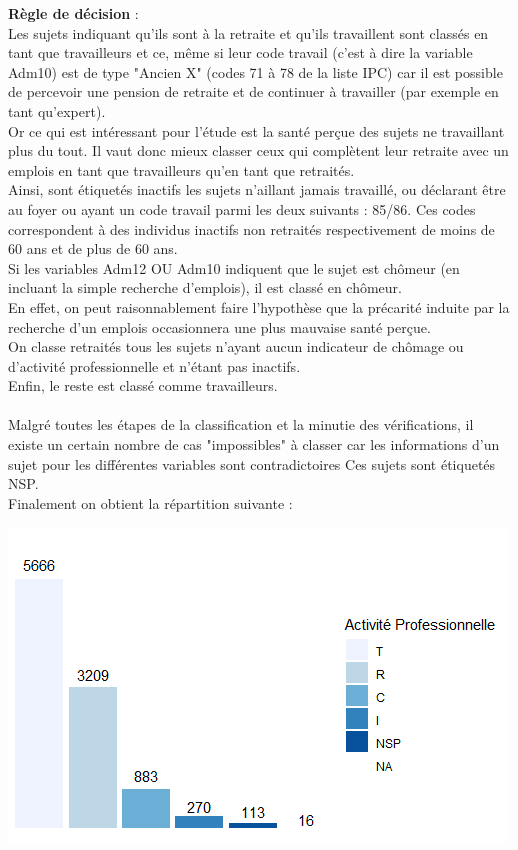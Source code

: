 \documentclass{book}
\begin{document}
\noindent
\textbf{Règle de décision} : \\

\noindent
Les sujets indiquant qu'ils sont à la retraite et qu'ils travaillent sont classés en tant que travailleurs et ce, même si leur code travail (c'est à dire la variable Adm10) est de type "Ancien X" (codes 71 à 78 de la liste IPC) car il est possible de percevoir une pension de retraite et de continuer à travailler (par exemple en tant qu'expert). \\
Or ce qui est intéressant pour l'étude est la santé perçue des sujets ne travaillant plus du tout. Il vaut donc mieux classer ceux qui complètent leur retraite avec un emplois en tant que travailleurs qu'en tant que retraités.\\
Ainsi, sont étiquetés inactifs les sujets n'aillant jamais travaillé, ou déclarant être au foyer ou ayant un code travail parmi les deux suivants : 85/86. Ces codes correspondent à des individus inactifs non retraités respectivement de moins de 60 ans et de plus de 60 ans.\\
Si les variables Adm12 OU Adm10 indiquent que le sujet est chômeur (en incluant la simple recherche d'emplois), il est classé en chômeur.\\
En effet, on peut raisonnablement faire l'hypothèse que la précarité induite par la recherche d'un emplois occasionnera une plus mauvaise santé perçue.\\
On classe retraités tous les sujets n'ayant aucun indicateur de chômage ou d'activité professionnelle et n'étant pas inactifs.\\
\noindent
Enfin, le reste est classé comme travailleurs.\\\\
\noindent
Malgré toutes les étapes de la classification et la minutie des vérifications, il  existe un certain nombre de cas "impossibles" à classer car les informations d'un sujet pour les différentes variables sont contradictoires Ces sujets sont étiquetés NSP.\\
\noindent
Finalement on obtient la répartition suivante : \\


\begin{center}
\includegraphics[scale=1]{activpro_barplot_manuel.png}
\end{center}
\end{document}
